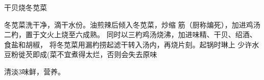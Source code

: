 \begin{recipe}{干贝烧冬苋菜}

\ingredients


\cooking

冬苋菜洗干净，滴干水份。油煎辣后倾入冬苋菜，炒缩 筋（厨称煸死），加进鸡汤二杓，置于文火上烧至六成熟。 同时以三杓鸡汤烧沸，加进味精、干贝、绍酒、食盐和胡椒， 将冬苋菜用漏杓捞起滤干转入汤内，再烧片刻。起锅时琳上 少许水豆粉徙芡即成(菜不宜煮得太烂，否则会失去原味

\notes

清淡3味鲜，营养。

\end{recipe}

